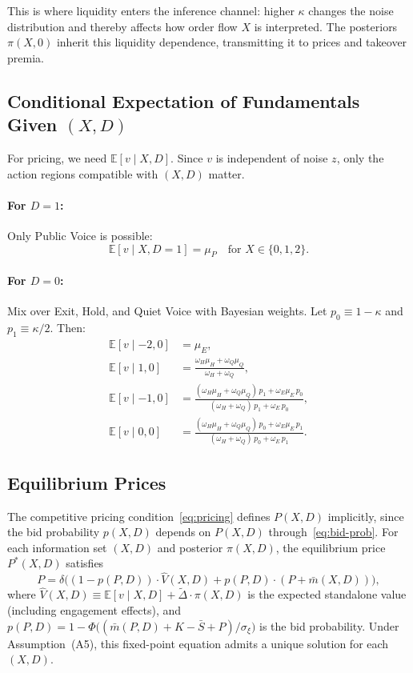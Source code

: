 \documentclass[11pt]{article}
\newcommand{\E}{\mathbb{E}}
\newcommand{\1}{\mathbf{1}}
\begin{document}
This is where liquidity enters the inference channel: higher $\kappa$ changes the noise distribution and thereby affects how order flow $X$ is interpreted. The posteriors $\pi(X,0)$ inherit this liquidity dependence, transmitting it to prices and takeover premia.

%
\subsection{Conditional Expectation of Fundamentals Given \texorpdfstring{$(X,D)$}{(X,D)}}
%

For pricing, we need $\E[v \mid X, D]$. Since $v$ is independent of noise $z$, only the action regions compatible with $(X, D)$ matter.

\paragraph{For $D=1$:} Only Public Voice is possible:
\[
\E[v \mid X, D=1] = \mu_P \quad \text{for } X \in \{0, 1, 2\}.
\]

\paragraph{For $D=0$:} Mix over Exit, Hold, and Quiet Voice with Bayesian weights. Let $p_0 \equiv 1 - \kappa$ and $p_1 \equiv \kappa/2$. Then:
\begin{align*}
\E[v \mid -2, 0] &= \mu_E, \\
\E[v \mid 1, 0] &= \frac{\omega_H \mu_H + \omega_Q \mu_Q}{\omega_H + \omega_Q}, \\
\E[v \mid -1, 0] &= \frac{(\omega_H \mu_H + \omega_Q \mu_Q) \, p_1 + \omega_E \mu_E \, p_0}{(\omega_H + \omega_Q) \, p_1 + \omega_E \, p_0}, \\
\E[v \mid 0, 0] &= \frac{(\omega_H \mu_H + \omega_Q \mu_Q) \, p_0 + \omega_E \mu_E \, p_1}{(\omega_H + \omega_Q) \, p_0 + \omega_E \, p_1}.
\end{align*}

%
\subsection{Equilibrium Prices}
\label{sec:prices}
%

The competitive pricing condition~\eqref{eq:pricing} defines $P(X,D)$ implicitly, since the bid probability $p(X,D)$ depends on $P(X,D)$ through~\eqref{eq:bid-prob}. For each information set $(X,D)$ and posterior $\pi(X,D)$, the equilibrium price $P^*(X,D)$ satisfies
\begin{equation}
P = \delta\Big((1-p(P,D)) \cdot \hat{V}(X,D) + p(P,D) \cdot (P + \bar{m}(X,D))\Big),
\label{eq:price-fp}
\end{equation}
where $\hat{V}(X,D) \equiv \E[v \mid X,D] + \tilde{\Delta} \cdot \pi(X,D)$ is the expected standalone value (including engagement effects), and $p(P,D) = 1 - \Phi\big((\bar{m}(P,D) + K - \bar{S} + P)/\sigma_\xi\big)$ is the bid probability. Under Assumption~\textup{(A5)}, this fixed-point equation admits a unique solution for each $(X,D)$.
\end{document}
